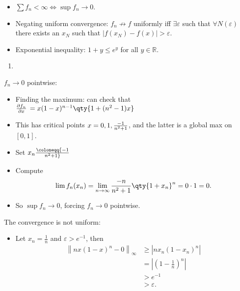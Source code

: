 \begin{solution}

\envlist

\begin{concept}

\envlist

\begin{itemize}
\tightlist
\item
  \(\sum f_n < \infty \iff \sup f_n \to 0\).
\item
  Negating uniform convergence: \(f_n\not\to f\) uniformly iff
  \(\exists {\varepsilon}\) such that \(\forall N({\varepsilon})\) there
  exists an \(x_N\) such that
  \({\left\lvert {f(x_N) - f(x)} \right\rvert} > {\varepsilon}\).
\item
  Exponential inequality: \(1+y \leq e^y\) for all
  \(y\in {\mathbb{R}}\).
\end{itemize}

\end{concept}

\begin{enumerate}
\def\labelenumi{\alph{enumi}.}
\tightlist
\item
\end{enumerate}

\(f_n\to 0\) pointwise:

\begin{itemize}
\tightlist
\item
  Finding the maximum: can check that
  \({\frac{\partial f_n}{\partial x}\,} = x(1-x)^{n-1} \qty{1 + (n^2-1)x}\)
\item
  This has critical points \(x=0, 1, {-1 \over n^2 + 1}\), and the
  latter is a global max on \([0, 1]\).
\item
  Set \(x_n \coloneqq{-1 \over n^2 + 1}\)
\item
  Compute
  \begin{align*}  
  \lim f_n(x_n) = \lim_{n\to \infty } {-n \over n^2 + 1} \qty{1 + x_n}^n = 0\cdot 1 = 0
  .\end{align*}
\item
  So \(\sup f_n \to 0\), forcing \(f_n \to 0\) pointwise.
\end{itemize}

The convergence is not uniform:

\begin{itemize}
\item
  Let \(x_n = \frac 1 n\) and \(\varepsilon > e^{-1}\), then
  \begin{align*}
  {\left\lVert {nx(1-x)^n - 0} \right\rVert}_\infty
  &\geq {\left\lvert {nx_n (1-x_n)^n} \right\rvert} \\
  &= {\left\lvert {\left( 1 - \frac 1 n\right)^n} \right\rvert} \\
  &> e^{-1} \\
  &> \varepsilon
  .\end{align*}


\end{itemize}
\end{solution}

